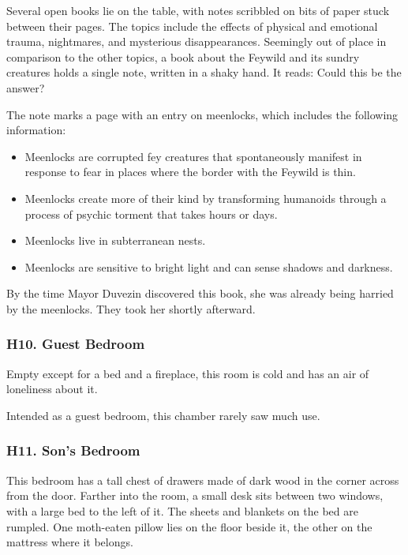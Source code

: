 \documentclass[10pt,a4paper,twoside,bg=print,twocolumn,openany,nodeprecatedcode]{dndbook}
\begin{document}
Several open books lie on the table, with notes scribbled on bits of paper stuck between their pages. The topics include the effects of physical and emotional trauma, nightmares, and mysterious disappearances. Seemingly out of place in comparison to the other topics, a book about the Feywild and its sundry creatures holds a single note, written in a shaky hand. It reads: Could this be the answer?

The note marks a page with an entry on meenlocks, which includes the following information:


\begin{itemize}
\item Meenlocks are corrupted fey creatures that spontaneously manifest in response to fear in places where the border with the Feywild is thin.
\item Meenlocks create more of their kind by transforming humanoids through a process of psychic torment that takes hours or days.
\item Meenlocks live in subterranean nests.
\item Meenlocks are sensitive to bright light and can sense shadows and darkness.
\end{itemize}

By the time Mayor Duvezin discovered this book, she was already being harried by the meenlocks. They took her shortly afterward.

\subsubsection{H10. Guest Bedroom}
\begin{DndReadAloud}{}
Empty except for a bed and a fireplace, this room is cold and has an air of loneliness about it.

\end{DndReadAloud}

Intended as a guest bedroom, this chamber rarely saw much use.

\subsubsection{H11. Son's Bedroom}
\begin{DndReadAloud}{}
This bedroom has a tall chest of drawers made of dark wood in the corner across from the door. Farther into the room, a small desk sits between two windows, with a large bed to the left of it. The sheets and blankets on the bed are rumpled. One moth-eaten pillow lies on the floor beside it, the other on the mattress where it belongs.

\end{DndReadAloud}
\end{document}
